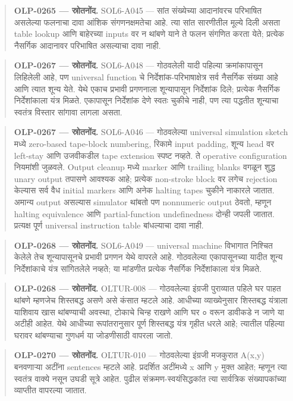 \begin{quote}\small\textbf{OLP-0265 — स्रोतनोंद.} SOL6-A045 — सांत संख्येच्या आदानांवरच परिभाषित असलेल्या फलनाचा दावा आंशिक संगणनक्षमतेचा आहे. त्या सांत सारणीतील मूल्ये दिली असता table lookup आणि बाहेरच्या inputs वर न थांबणे याने ते फलन संगणित करता येते; प्रत्येक नैसर्गिक आदानावर परिभाषित असल्याचा दावा नाही.\end{quote}
\begin{quote}\small\textbf{OLP-0267 — स्रोतनोंद.} SOL6-A048 — गोठवलेली यादी पहिल्या क्रमांकापासून लिहिलेली आहे, पण universal function चे निर्देशांक-परिभाषाक्षेत्र सर्व नैसर्गिक संख्या आहे आणि त्यात शून्य येते. येथे एकाच प्रभावी प्रगणनाला शून्यापासून निर्देशांक दिले; प्रत्येक नैसर्गिक निर्देशांकाला यंत्र मिळते. एकापासून निर्देशांक देणे स्वतः चुकीचे नाही, पण त्या पद्धतीत शून्याचा स्वतंत्र विस्तार सांगावा लागला असता.\end{quote}
\begin{quote}\small\textbf{OLP-0267 — स्रोतनोंद.} SOL6-A046 — गोठवलेल्या universal simulation sketch मध्ये zero-based tape-block numbering, रिकामे input padding, शून्य head वर left-stay आणि उजवीकडील tape extension स्पष्ट नव्हते. ते operative configuration नियमांशी जुळवले. Output cleanup मध्ये marker आणि trailing blanks वगळून शुद्ध unary output तपासणे आवश्यक आहे; प्रत्येक non-stroke block वर लगेच rejection केल्यास सर्व वैध initial markers आणि अनेक halting tapes चुकीने नाकारले जातात. अमान्य output असल्यास simulator थांबतो पण nonnumeric output ठेवतो, म्हणून halting equivalence आणि partial-function undefinedness दोन्ही जपली जातात. प्रत्यक्ष पूर्ण universal instruction table बांधल्याचा दावा नाही.\end{quote}
\begin{quote}\small\textbf{OLP-0268 — स्रोतनोंद.} SOL6-A049 — universal machine विभागात निश्चित केलेले तेच शून्यापासूनचे प्रभावी प्रगणन येथे वापरले आहे. गोठवलेल्या एकापासूनच्या यादीत शून्य निर्देशांकाचे यंत्र सांगितलेले नव्हते; या मांडणीत प्रत्येक नैसर्गिक निर्देशांकाला यंत्र मिळते.\end{quote}
\begin{quote}\small\textbf{OLP-0268 — स्रोतनोंद.} OLTUR-008 — गोठवलेल्या इंग्रजी पुराव्यात पहिले घर पाहत थांबणे म्हणजेच शिस्तबद्ध असणे असे कंसात म्हटले आहे. आधीच्या व्याख्येनुसार शिस्तबद्ध यंत्राला याशिवाय खास थांबण्याची अवस्था, टोकाचे चिन्ह राखणे आणि घर ० वरून डावीकडे न जाणे या अटीही आहेत. येथे आधीच्या रूपांतरानुसार पूर्ण शिस्तबद्ध यंत्र गृहीत धरले आहे; त्यातील पहिल्या घरावर थांबण्याचा गुणधर्म या जोडणीसाठी वापरला जातो.\end{quote}
\begin{quote}\small\textbf{OLP-0270 — स्रोतनोंद.} OLTUR-010 — गोठवलेल्या इंग्रजी मजकुरात A(x,y) बनवणाऱ्या अटींना sentences म्हटले आहे. प्रदर्शित अटींमध्ये x आणि y मुक्त आहेत; म्हणून त्या स्वतंत्र वाक्ये नसून उघडी सूत्रे आहेत. पुढील संक्रमण-स्वयंसिद्धकांत त्या सार्वत्रिक संख्यापकांच्या व्याप्तीत वापरल्या जातात.\end{quote}
